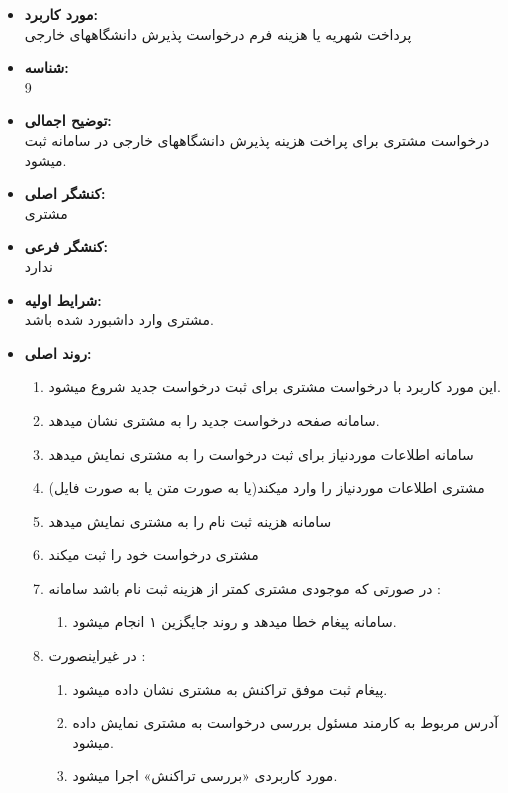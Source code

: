 \documentclass{article}
\begin{document}
\begin{itemize}
\item \textbf{مورد کاربرد:}\\
پرداخت شهریه یا هزینه فرم درخواست پذیرش دانشگاههای خارجی
\item \textbf{شناسه:}\\
9
\item \textbf{توضیح اجمالی:}\\
درخواست مشتری برای پراخت هزینه پذیرش دانشگاههای خارجی در سامانه ثبت میشود.
\item \textbf{کنشگر اصلی:}\\
مشتری
\item \textbf{کنشگر فرعی:}\\
ندارد
\item \textbf{شرایط اولیه:}\\
مشتری وارد داشبورد شده باشد.
\item \textbf{روند اصلی:}\\
\begin{enumerate}
\item  این مورد کاربرد با درخواست مشتری برای ثبت درخواست جدید شروع میشود.
\item سامانه صفحه درخواست جدید را به مشتری نشان میدهد.
\item سامانه اطلاعات موردنیاز برای ثبت درخواست را به مشتری نمایش میدهد
\item مشتری اطلاعات موردنیاز را وارد میکند(یا به صورت متن یا به صورت فایل)
\item سامانه هزینه ثبت نام را به مشتری نمایش میدهد
\item مشتری درخواست خود را ثبت میکند
\item در صورتی که موجودی مشتری کمتر از هزینه ثبت نام باشد سامانه :
\begin{enumerate}
\item سامانه پیغام خطا میدهد و روند جایگزین ۱ انجام میشود. 
\end{enumerate}

\item در غیراینصورت	:
\begin{enumerate}
\item پیغام ثبت موفق تراکنش به مشتری نشان داده میشود.
\item آدرس مربوط به کارمند مسئول بررسی درخواست به مشتری نمایش داده میشود.
\item مورد کاربردی «بررسی تراکنش» اجرا میشود.
\end{enumerate}

\end{enumerate}


\end{itemize}
\end{document}
